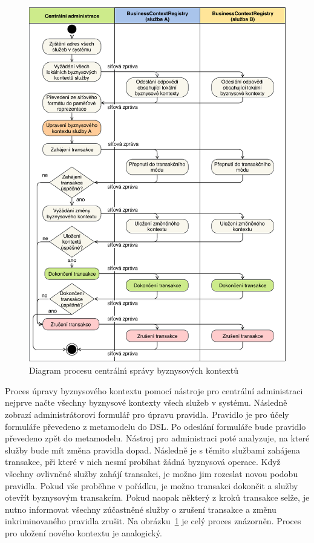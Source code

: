 \begin{figure}
    \centering
    \includegraphics[keepaspectratio=true, width=\linewidth]{figures/business-context-management.pdf}
    \caption{Diagram procesu centráln\'{\i} správy byznysov\'ych kontextů}
    \label{fig:business-context-management}
\end{figure}

Proces úpravy byznysového kontextu pomocí nástroje pro centrální administraci nejprve načte všechny
byznysové kontexty všech služeb v systému. Následně zobrazí administrátorovi formulář pro úpravu pravidla.
Pravidlo je pro účely formuláře převedeno z metamodelu do \gls{DSL}. Po odeslání formuláře bude pravidlo
převedeno zpět do metamodelu. Nástroj pro administraci poté analyzuje, na které služby bude
mít změna pravidla dopad. Následně je s těmito službami zahájena transakce, při které v nich
nesmí probíhat žádná byznysová operace. Když všechny ovlivněné služby zahájí transakci, je možno
jim rozeslat novou podobu pravidla. Pokud vše proběhne v pořádku, je možno transakci dokončit
a služby otevřít byznysovým transakcím. Pokud naopak některý z kroků transakce selže, je nutno
informovat všechny zúčastněné služby o zrušení transakce a změnu inkriminovaného pravidla zrušit.
Na obrázku~\ref{fig:business-context-management} je celý proces znázorněn. Proces pro uložení
nového kontextu je analogický.

